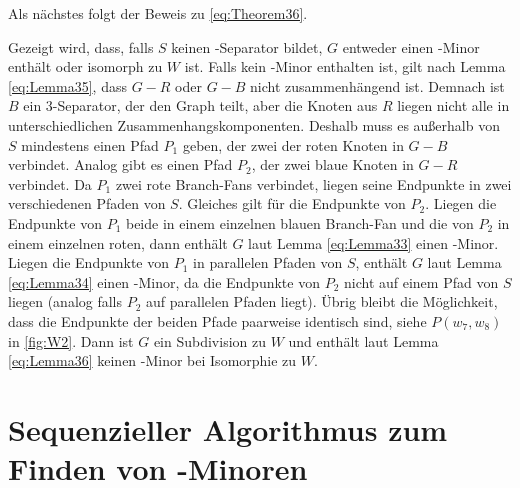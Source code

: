 Als nächstes folgt der Beweis zu \ref{eq:Theorem36}.
\begin{beweis}
  Gezeigt wird, dass, falls $S$ keinen \dd-Separator bildet, $G$ entweder einen \kf-Minor enthält oder isomorph zu $W$ ist.
  Falls kein \kf-Minor enthalten ist, gilt nach Lemma \ref{eq:Lemma35}, dass $G - R$ oder $G - B$ nicht zusammenhängend ist.
  Demnach ist $B$ ein $3$-Separator, der den Graph teilt, aber die Knoten aus $R$ liegen nicht alle in unterschiedlichen Zusammenhangskomponenten.
  Deshalb muss es außerhalb von $S$ mindestens einen Pfad $P_1$ geben, der zwei der roten Knoten in $G - B$ verbindet.
  Analog gibt es einen Pfad $P_2$, der zwei blaue Knoten in $G - R$ verbindet.
  Da $P_1$ zwei rote Branch-Fans verbindet, liegen seine Endpunkte in zwei verschiedenen Pfaden von $S$.
  Gleiches gilt für die Endpunkte von $P_2$.
  Liegen die Endpunkte von $P_1$ beide in einem einzelnen blauen Branch-Fan und die von $P_2$ in einem einzelnen roten, dann enthält $G$ laut Lemma \ref{eq:Lemma33} einen \kf-Minor.
  Liegen die Endpunkte von $P_1$ in parallelen Pfaden von $S$, enthält $G$ laut Lemma \ref{eq:Lemma34} einen \kf-Minor, da die Endpunkte von $P_2$ nicht auf einem Pfad von $S$ liegen (analog falls $P_2$ auf parallelen Pfaden liegt).
  Übrig bleibt die Möglichkeit, dass die Endpunkte der beiden Pfade paarweise identisch sind, siehe $P(w_7, w_8)$ in \Abb \ref{fig:W2}.
  Dann ist $G$ ein Subdivision zu $W$ und enthält laut Lemma \ref{eq:Lemma36} keinen \kf-Minor bei Isomorphie zu $W$.
  \cite{KeM92}
\end{beweis}


\section{Sequenzieller Algorithmus zum Finden von \kf-Minoren}
\label{sec:sequenzieller_algorithmus_zum_finden_von_kf_minoren}

